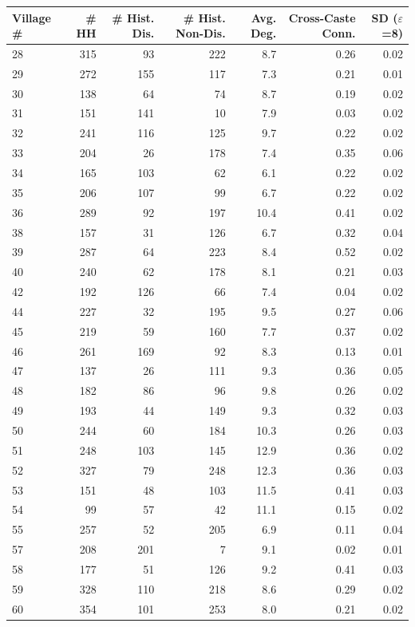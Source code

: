 \begin{tabular}{lrrrrrr}
\hline
Village \# & \# HH & \# Hist. Dis. & \# Hist. Non-Dis. & Avg. Deg. & Cross-Caste Conn. & SD ($\varepsilon$=8) \\
\hline
28 & 315 & 93 & 222 & 8.7 & 0.26 & 0.02 \\
29 & 272 & 155 & 117 & 7.3 & 0.21 & 0.01 \\
30 & 138 & 64 & 74 & 8.7 & 0.19 & 0.02 \\
31 & 151 & 141 & 10 & 7.9 & 0.03 & 0.02 \\
32 & 241 & 116 & 125 & 9.7 & 0.22 & 0.02 \\
33 & 204 & 26 & 178 & 7.4 & 0.35 & 0.06 \\
34 & 165 & 103 & 62 & 6.1 & 0.22 & 0.02 \\
35 & 206 & 107 & 99 & 6.7 & 0.22 & 0.02 \\
36 & 289 & 92 & 197 & 10.4 & 0.41 & 0.02 \\
38 & 157 & 31 & 126 & 6.7 & 0.32 & 0.04 \\
39 & 287 & 64 & 223 & 8.4 & 0.52 & 0.02 \\
40 & 240 & 62 & 178 & 8.1 & 0.21 & 0.03 \\
42 & 192 & 126 & 66 & 7.4 & 0.04 & 0.02 \\
44 & 227 & 32 & 195 & 9.5 & 0.27 & 0.06 \\
45 & 219 & 59 & 160 & 7.7 & 0.37 & 0.02 \\
46 & 261 & 169 & 92 & 8.3 & 0.13 & 0.01 \\
47 & 137 & 26 & 111 & 9.3 & 0.36 & 0.05 \\
48 & 182 & 86 & 96 & 9.8 & 0.26 & 0.02 \\
49 & 193 & 44 & 149 & 9.3 & 0.32 & 0.03 \\
50 & 244 & 60 & 184 & 10.3 & 0.26 & 0.03 \\
51 & 248 & 103 & 145 & 12.9 & 0.36 & 0.02 \\
52 & 327 & 79 & 248 & 12.3 & 0.36 & 0.03 \\
53 & 151 & 48 & 103 & 11.5 & 0.41 & 0.03 \\
54 & 99 & 57 & 42 & 11.1 & 0.15 & 0.02 \\
55 & 257 & 52 & 205 & 6.9 & 0.11 & 0.04 \\
57 & 208 & 201 & 7 & 9.1 & 0.02 & 0.01 \\
58 & 177 & 51 & 126 & 9.2 & 0.41 & 0.03 \\
59 & 328 & 110 & 218 & 8.6 & 0.29 & 0.02 \\
60 & 354 & 101 & 253 & 8.0 & 0.21 & 0.02 \\

\end{tabular}
